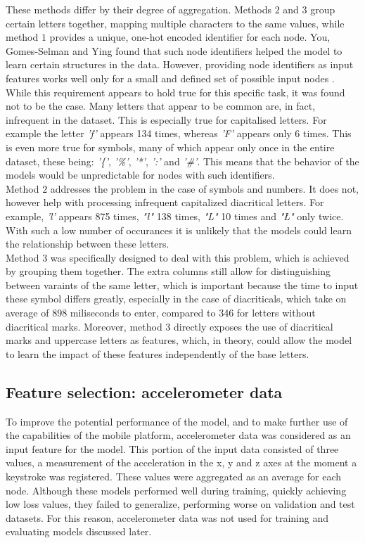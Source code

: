 These methods differ by their degree of aggregation. Methods $2$ and $3$ group certain letters together, mapping multiple characters to the same values, while method $1$ provides a unique, one-hot encoded identifier for each node. You, Gomes-Selman and Ying \cite{you2021identityawaregraphneuralnetworks}
found that such node identifiers helped the model to learn certain structures in the data. However, providing node identifiers as input features works well only for a small and defined set of possible input nodes \cite{Lesk2024}. While this requirement appears to hold true for this specific task, it was found not to be the case.
Many letters that appear to be common are, in fact, infrequent in the dataset. This is especially true for capitalised letters. For example the letter \textit{'f'} appears 134 times, whereas \textit{'F'} appears only 6 times. This is even more true for symbols, many of which appear only once in the entire dataset, these being: \textit{'\{'}, \textit{'\%'}, \textit{'*'}, \textit{':'} and \textit{'\#'}.
This means that the behavior of the models would be unpredictable for nodes with such identifiers.\\
Method $2$ addresses the problem in the case of symbols and numbers. It does not, however help with processing infrequent capitalized diacritical letters. For example, \textit{'l'} appears 875 times, \textit{"ł"} 138 times, \textit{"L"} 10 times and \textit{"Ł"} only twice. With such a low number of occurances it is unlikely that the models could learn the relationship between these letters. \\
Method $3$ was specifically designed to deal with this problem, which is achieved by grouping them together. The extra columns still allow for distinguishing between varaints of the same letter, which is important because the time to input these symbol differs greatly, especially in the case of diacriticals, which take on average of 898 miliseconds to enter, compared to 346 for letters without diacritical marks.
Moreover, method $3$ directly exposes the use of diacritical marks and uppercase letters as features, which, in theory, could allow the model to learn the impact of these features independently of the base letters. 

\subsection{Feature selection: accelerometer data} \label{accel_subsection}
To improve the potential performance of the model, and to make further use of the capabilities of the mobile platform, accelerometer data was considered as an input feature for the model. %
This portion of the input data consisted of three values, a measurement of the acceleration in the x, y and z axes at the moment a keystroke was registered. 
These values were aggregated as an average for each node. Although these models performed well during training, quickly achieving low loss values, they failed to generalize, performing worse on validation and test datasets. For this reason, accelerometer data was not used for training and evaluating models discussed later.

